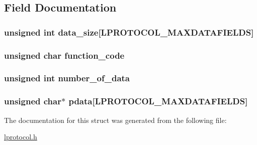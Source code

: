 \subsection{Field Documentation}
\hypertarget{structlprotocoldata__t_ab055641d3928c9fa48f39acea207bc4f}{
\subsubsection[{data\_\-size}]{\setlength{\rightskip}{0pt plus 5cm}unsigned int {\bf data\_\-size}\mbox{[}LPROTOCOL\_\-MAXDATAFIELDS\mbox{]}}}
\label{structlprotocoldata__t_ab055641d3928c9fa48f39acea207bc4f}
\hypertarget{structlprotocoldata__t_a4dbe150a36c617bdbd5c8b8c811d943e}{
\subsubsection[{function\_\-code}]{\setlength{\rightskip}{0pt plus 5cm}unsigned char {\bf function\_\-code}}}
\label{structlprotocoldata__t_a4dbe150a36c617bdbd5c8b8c811d943e}
\hypertarget{structlprotocoldata__t_a2160b071039853bf1534a09e89b92bdc}{
\subsubsection[{number\_\-of\_\-data}]{\setlength{\rightskip}{0pt plus 5cm}unsigned int {\bf number\_\-of\_\-data}}}
\label{structlprotocoldata__t_a2160b071039853bf1534a09e89b92bdc}
\hypertarget{structlprotocoldata__t_af79115ffc4e2dcca229b8883c5578c8b}{
\subsubsection[{pdata}]{\setlength{\rightskip}{0pt plus 5cm}unsigned char$\ast$ {\bf pdata}\mbox{[}LPROTOCOL\_\-MAXDATAFIELDS\mbox{]}}}
\label{structlprotocoldata__t_af79115ffc4e2dcca229b8883c5578c8b}


The documentation for this struct was generated from the following file:\begin{DoxyCompactItemize}
\item 
\hyperlink{lprotocol_8h}{lprotocol.h}\end{DoxyCompactItemize}
